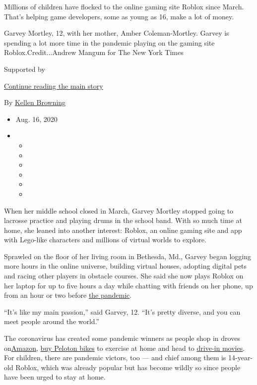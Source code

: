 Millions of children have flocked to the online gaming site Roblox since
March. That's helping game developers, some as young as 16, make a lot
of money.

Garvey Mortley, 12, with her mother, Amber Coleman-Mortley. Garvey is
spending a lot more time in the pandemic playing on the gaming site
Roblox.Credit...Andrew Mangum for The New York Times

Supported by

\protect\hyperlink{after-sponsor}{Continue reading the main story}

By \href{https://www.nytimes3xbfgragh.onion/by/kellen-browning}{Kellen
Browning}

\begin{itemize}
\item
  Aug. 16, 2020
\item
  \begin{itemize}
  \item
  \item
  \item
  \item
  \item
  \item
  \end{itemize}
\end{itemize}

When her middle school closed in March, Garvey Mortley stopped going to
lacrosse practice and playing drums in the school band. With so much
time at home, she leaned into another interest: Roblox, an online gaming
site and app with Lego-like characters and millions of virtual worlds to
explore.

Sprawled on the floor of her living room in Bethesda, Md., Garvey began
logging more hours in the online universe, building virtual houses,
adopting digital pets and racing other players in obstacle courses. She
said she now plays Roblox on her laptop for up to five hours a day while
chatting with friends on her phone, up from an hour or two before
\href{https://www.nytimes3xbfgragh.onion/news-event/coronavirus?name=styln-coronavirus-national\&region=TOP_BANNER\&variant=1_Show\&block=storyline_menu_recirc\&action=click\&pgtype=Interactive\&impression_id=cfb8d020-dd71-11ea-bf10-75191c97e453}{the
pandemic}.

``It's like my main passion,'' said Garvey, 12. ``It's pretty diverse,
and you can meet people around the world.''

The coronavirus has created some pandemic winners as people shop in
droves
on\href{https://www.nytimes3xbfgragh.onion/live/2020/07/30/business/stock-market-today-coronavirus\#amazons-earnings-double-as-sales-surge}{Amazon},
\href{https://www.nytimes3xbfgragh.onion/2020/05/06/technology/peloton-boom-workout-virus.html}{buy
Peloton bikes} to exercise at home and head to
\href{https://www.nytimes3xbfgragh.onion/2020/03/24/style/drive-in-theaters-coronavirus.html}{drive-in
movies}. For children, there are pandemic victors, too --- and chief
among them is 14-year-old Roblox, which was already popular but has
become wildly so since people have been urged to stay at home.

